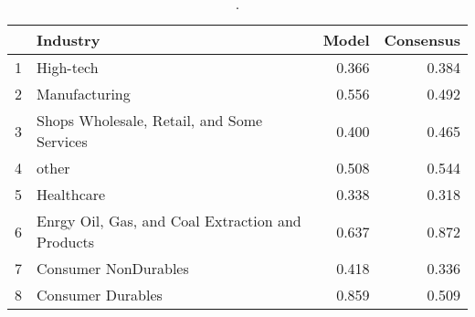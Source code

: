 \begin{table}[ht]
\centering
\begin{tabular}{rlrr}
  \hline
 & Industry & Model & Consensus \\ 
  \hline
1 & High-tech & 0.366 & 0.384 \\ 
  2 & Manufacturing & 0.556 & 0.492 \\ 
  3 & Shops Wholesale, Retail, and Some Services & 0.400 & 0.465 \\ 
  4 & other & 0.508 & 0.544 \\ 
  5 & Healthcare & 0.338 & 0.318 \\ 
  6 & Enrgy Oil, Gas, and Coal Extraction and Products & 0.637 & 0.872 \\ 
  7 & Consumer NonDurables & 0.418 & 0.336 \\ 
  8 & Consumer Durables & 0.859 & 0.509 \\ 
   \hline
\end{tabular}
\caption{.} 
\label{spe-by-industry-table-fy2}
\end{table}
